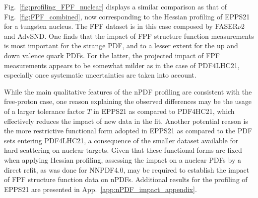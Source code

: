 Fig.~\ref{fig:profiling_FPF_nuclear} displays a similar comparison as that of
Fig.~\ref{fig:FPF_combined}, now corresponding to the Hessian
profiling of EPPS21 for a tungsten nucleus.
%
The FPF dataset is in this case composed by FASER$\nu$2 and AdvSND.
%
One finds that the impact of FPF structure function measurements
is most important for the strange PDF, and to a lesser extent for the up and down
valence quark PDFs.
%
For the latter, the projected impact of FPF measurements appears to be somewhat milder
as in the case of PDF4LHC21, especially once systematic uncertainties are taken into account.

While the main qualitative features of the nPDF profiling are consistent with the free-proton
case, one reason explaining the observed differences may be the usage of a larger tolerance factor $T$ in EPPS21
as compared to PDF4HC21, which effectively reduces the impact of new data in the fit.
%
Another potential reason is the more restrictive functional form adopted in EPPS21 as compared
to the PDF sets entering PDF4LHC21, a consequence of the smaller dataset available
for hard scattering on nuclear targets.
%
Given that these  functional forms are fixed when applying Hessian profiling,
assessing the impact on a nuclear PDFs by a direct refit, as was done for NNPDF4.0,
may be required to establish the impact of FPF structure function data
on nPDFs.
%
Additional results for the profiling of EPPS21 are presented in App.~\ref{app:nPDF_impact_appendix}.
